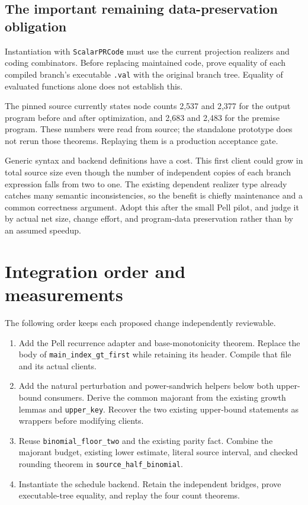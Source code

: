 \documentclass[11pt,a4paper]{article}
\newcommand{\code}[1]{\nolinkurl{#1}}
\begin{document}
\subsection{The important remaining data-preservation obligation}

Instantiation with \code{ScalarPRCode} must use the current projection
realizers and coding combinators. Before replacing maintained code, prove
equality of each compiled branch's executable \code{.val} with the original
branch tree. Equality of evaluated functions alone does not establish this.

The pinned source currently states node counts 2,537 and 2,377 for the output
program before and after optimization, and 2,683 and 2,483 for the premise
program. These numbers were read from source; the standalone prototype does
not rerun those theorems. Replaying them is a production acceptance gate.

Generic syntax and backend definitions have a cost. This first client could
grow in total source size even though the number of independent copies of
each branch expression falls from two to one. The existing dependent realizer
type already catches many semantic inconsistencies, so the benefit is chiefly
maintenance and a common correctness argument. Adopt this after the small Pell
pilot, and judge it by actual net size, change effort, and program-data
preservation rather than by an assumed speedup.

\section{Integration order and measurements}

The following order keeps each proposed change independently reviewable.

\begin{enumerate}
\item Add the Pell recurrence adapter and base-monotonicity theorem. Replace
the body of \code{main_index_gt_first} while retaining its header. Compile
that file and its actual clients.
\item Add the natural perturbation and power-sandwich helpers below both
upper-bound consumers. Derive the common majorant from the existing growth
lemmas and \code{upper_key}. Recover the two existing upper-bound statements
as wrappers before modifying clients.
\item Reuse \code{binomial_floor_two} and the existing parity fact. Combine the
majorant budget, existing lower estimate, literal source interval, and checked
rounding theorem in \code{source_half_binomial}.
\item Instantiate the schedule backend. Retain the independent bridges,
prove executable-tree equality, and replay the four count theorems.
\end{enumerate}
\end{document}
